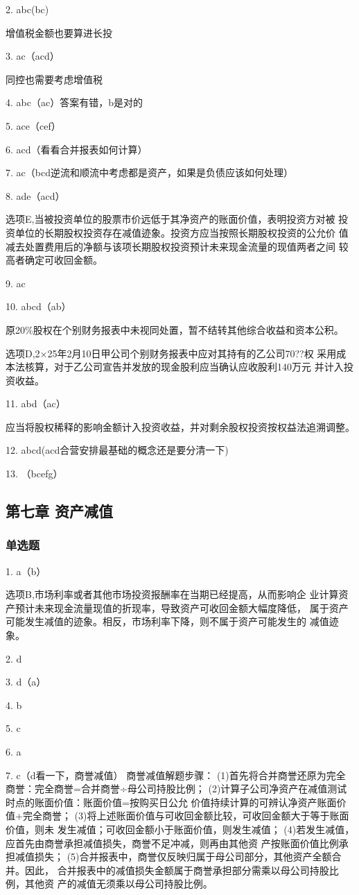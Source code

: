\documentclass[UTF8,12pt]{ctexart}
\numberwithin{equation}{section} %
\numberwithin{figure}{section}
\numberwithin{table}{section}
\begin{document}
	2. abc(bc)
	
	增值税金额也要算进长投
	
	3. ac（acd）
	
	同控也需要考虑增值税
	
	4. abc（ac）答案有错，b是对的
	
	5. ace（cef）
	
	6. acd（看看合并报表如何计算）
	
	7. ac（bcd逆流和顺流中考虑都是资产，如果是负债应该如何处理）
	
	8. ade（acd）
	
	选项E,当被投资单位的股票市价远低于其净资产的账面价值，表明投资方对被
	投资单位的长期股权投资存在减值迹象。投资方应当按照长期股权投资的公允价
	值减去处置费用后的净额与该项长期股权投资预计未来现金流量的现值两者之间
	较高者确定可收回金额。
	
	9. ac
	
	10. abcd（ab）
	
	原20\%股权在个别财务报表中未视同处置，暂不结转其他综合收益和资本公积。
	
	选项D,2×25年2月10日甲公司个别财务报表中应对其持有的乙公司70??权
	采用成本法核算，对于乙公司宣告并发放的现金股利应当确认应收股利140万元
	并计入投资收益。
	
	11. abd（ac）
	
	应当将股权稀释的影响金额计入投资收益，并对剩余股权投资按权益法追溯调整。
	
	12. abcd(acd合营安排最基础的概念还是要分清一下)
	
	13. （bcefg）
	
	\subsection{第七章 资产减值}
	\subsubsection{单选题}
	1. a（b）
	
	选项B,市场利率或者其他市场投资报酬率在当期已经提高，从而影响企
	业计算资产预计未来现金流量现值的折现率，导致资产可收回金额大幅度降低，
	属于资产可能发生减值的迹象。相反，市场利率下降，则不属于资产可能发生的
	减值迹象。
	
	2. d
	
	3. d（a）
	
	4. b
	
	5. c
	
	6. a
	
	7. c（d看一下，商誉减值）
	商誉减值解题步骤：
	(1)首先将合并商誉还原为完全商誉：完全商誉=合并商誉÷母公司持股比例；
	(2)计算子公司净资产在减值测试时点的账面价值：账面价值=按购买日公允
	价值持续计算的可辨认净资产账面价值+完全商誉；
	(3)将上述账面价值与可收回金额比较，可收回金额大于等于账面价值，则未
	发生减值；可收回金额小于账面价值，则发生减值；
	(4)若发生减值，应首先由商誉承担减值损失，商誉不足冲减，则再由其他资
	产按账面价值比例承担减值损失；
	(5)合并报表中，商誉仅反映归属于母公司部分，其他资产全额合并。因此，
	合并报表中的减值损失金额属于商誉承担部分需乘以母公司持股比例，其他资
	产的减值无须乘以母公司持股比例。
	
\end{document}
